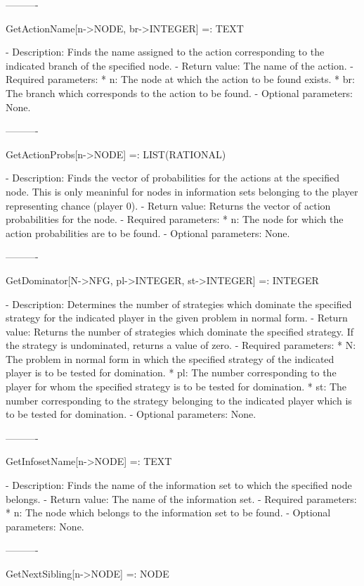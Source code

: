 ----------

GetActionName[n->NODE, br->INTEGER] =: TEXT

   -	Description:  Finds the name assigned to the action corresponding to 
	the indicated branch of the specified node.
   -	Return value:  The name of the action.
   -	Required parameters:
	  *  n:  The node at which the action to be found exists.
	  *  br:  The branch which corresponds to the action to be found.
   -	Optional parameters:  None.

----------

GetActionProbs[n->NODE] =: LIST(RATIONAL)

   -	Description:  Finds the vector of probabilities for the actions at the
	specified node.  This is only meaninful for nodes in information sets 
	belonging to the player representing chance (player 0).
   -	Return value:  Returns the vector of action probabilities for the node.
   -	Required parameters: 
	  *  n:  The node for which the action probabilities are to be found.
   -	Optional parameters:  None.

----------

GetDominator[N->NFG, pl->INTEGER, st->INTEGER] =: INTEGER

   -	Description:  Determines the number of strategies which dominate the
	specified strategy for the indicated player in the given problem in 
	normal form.
   -	Return value:  Returns the number of strategies which dominate the
	specified strategy.  If the strategy is undominated, returns a value of
	zero.  
   -	Required parameters:
	  *  N:  The problem in normal form in which the specified strategy of
		the indicated player is to be tested for domination.
	  *  pl:  The number corresponding to the player for whom the specified
		strategy is to be tested for domination.
	  *  st:  The number corresponding to the strategy belonging to the 
		indicated player which is to be tested for domination.
   -	Optional parameters:  None.

----------

GetInfosetName[n->NODE] =: TEXT

   -	Description:  Finds the name of the information set to which the 
	specified node belongs.
   -	Return value:  The name of the information set.
   -	Required parameters:
	  *  n:  The node which belongs to the information set to be found.
   -	Optional parameters:  None.

----------

GetNextSibling[n->NODE] =: NODE

